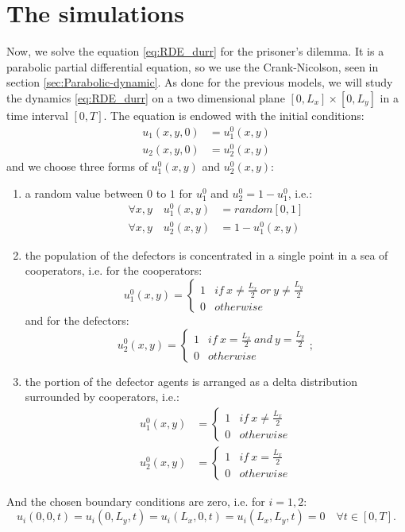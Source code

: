 \section{The simulations\label{sec:The-simulations-2}}

Now, we solve the equation \ref{eq:RDE_durr} for the prisoner's dilemma.
It is a parabolic partial differential equation, so we use the Crank-Nicolson,
seen in section \ref{sec:Parabolic-dynamic}. As done for the previous
models, we will study the dynamics \ref{eq:RDE_durr} on a two dimensional
plane $\left[0,L_{x}\right]\times\left[0,L_{y}\right]$ in a time
interval $\left[0,T\right]$. The equation is endowed with the initial
conditions:
\begin{align*}
u_{1}\left(x,y,0\right) & =u_{1}^{0}\left(x,y\right)\\
u_{2}\left(x,y,0\right) & =u_{2}^{0}\left(x,y\right)
\end{align*}
and we choose three forms of $u_{1}^{0}\left(x,y\right)$ and $u_{2}^{0}\left(x,y\right)$:
\begin{enumerate}
\item a random value between $0$ to $1$ for $u_{1}^{0}$ and $u_{2}^{0}=1-u_{1}^{0}$,
i.e.: 
\begin{align*}
\forall x,y\quad u_{1}^{0}\left(x,y\right) & =random\left[0,1\right]\\
\forall x,y\quad u_{2}^{0}\left(x,y\right) & =1-u_{1}^{0}\left(x,y\right)
\end{align*}
\item the population of the defectors is concentrated in a single point
in a sea of cooperators, i.e. for the cooperators:
\[
u_{1}^{0}\left(x,y\right)=\begin{cases}
1 & if\ x\neq\frac{L_{x}}{2}\ or\ y\neq\frac{L_{y}}{2}\\
0 & otherwise
\end{cases}
\]
 and for the defectors:
\[
u_{2}^{0}\left(x,y\right)=\begin{cases}
1 & if\ x=\frac{L_{x}}{2}\ and\ y=\frac{L_{y}}{2}\\
0 & otherwise
\end{cases};
\]
\item the portion of the defector agents is arranged as a delta distribution
surrounded by cooperators, i.e.:
\begin{align*}
u_{1}^{0}\left(x,y\right) & =\begin{cases}
1 & if\ x\neq\frac{L_{x}}{2}\\
0 & otherwise
\end{cases}\\
u_{2}^{0}\left(x,y\right) & =\begin{cases}
1 & if\ x=\frac{L_{x}}{2}\\
0 & otherwise
\end{cases}
\end{align*}
\end{enumerate}
And the chosen boundary conditions are zero, i.e. for $i=1,2$:
\[
u_{i}\left(0,0,t\right)=u_{i}\left(0,L_{y},t\right)=u_{i}\left(L_{x},0,t\right)=u_{i}\left(L_{x},L_{y},t\right)=0\quad\forall t\in\left[0,T\right].
\]


